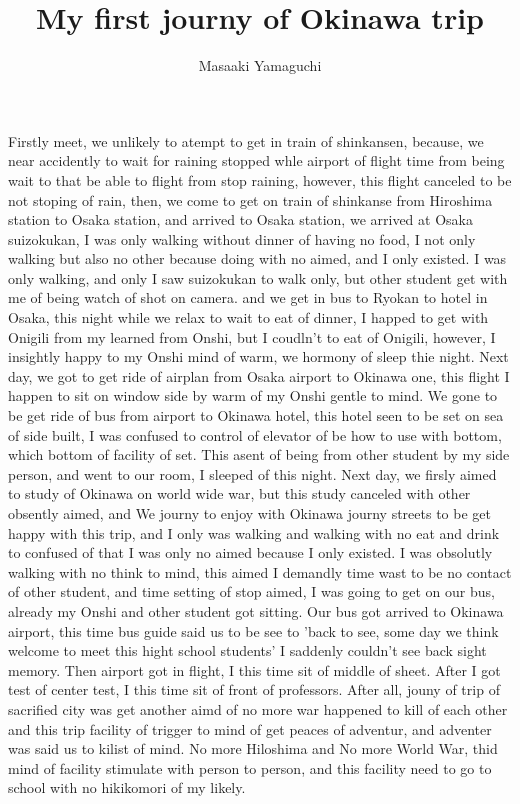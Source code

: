\documentclass{jsarticle}
\begin{document}
\title{My first journy of Okinawa trip}
\author{Masaaki Yamaguchi}
\date{}
\maketitle

     Firstly meet, we unlikely to atempt to get in train of shinkansen,
   because, we near accidently to wait for raining stopped whle airport of
   flight time from being wait to that be able to flight from stop raining,
   however, this flight canceled to be not stoping of rain,
   then, we come to get on train of shinkanse from Hiroshima station to
   Osaka station, and arrived to Osaka station, 
   we arrived at Osaka suizokukan, I was only walking without dinner of
   having no food, I not only walking but also no other because
   doing with no aimed, and I only existed. I was only walking,
   and only I saw suizokukan to walk only, but other student get with
   me of being watch of shot on camera.
   and we get in bus to
   Ryokan to hotel in Osaka, this night while we relax to wait to eat
   of dinner, I happed to get with Onigili from my learned from Onshi,
   but I coudln't to eat of Onigili, however, I insightly happy to my
   Onshi mind of warm, we hormony of sleep thie night.
   Next day, we got to get ride of airplan from Osaka airport to Okinawa
   one, this flight I happen to sit on window side by warm of my Onshi
   gentle to mind.
    We gone to be get ride of bus from airport to Okinawa hotel,
   this hotel seen to be set on sea of side built,
   I was confused to control of elevator of be how to use with bottom,
   which bottom of facility of set.
   This asent of being from other student by my side person,
   and went to our room, I sleeped of this night.
   Next day, we firsly aimed to study of Okinawa on world wide war,
   but this study canceled with other obsently aimed,
   and We journy to enjoy with Okinawa journy streets to be get happy
   with this trip, and I only was walking and walking with no eat and
   drink to confused of that I was only no aimed because I only existed.
   I was obsolutly walking with no think to mind, this aimed I demandly
   time wast to be no contact of other student,
   and time setting of stop aimed, I was going to get on our bus,
   already my Onshi and other student got sitting.
   Our bus got arrived to Okinawa airport, this time bus guide said us
   to be see to 'back to see, some day we think welcome to meet this
   hight school students'
   I saddenly couldn't see back sight memory.
   Then airport got in flight, I this time sit of middle of sheet.
   After I got test of center test, I this time sit of front of professors.
   After all, jouny of trip of sacrified city was get another aimd
   of no more war happened to kill of each other and this trip facility
   of trigger to mind of get peaces of adventur, and adventer was said us
   to kilist of mind.
   No more Hiloshima and No more World War, thid mind of facility
   stimulate with person to person, and this facility need to
   go to school with no hikikomori of my likely.
\end{document}
